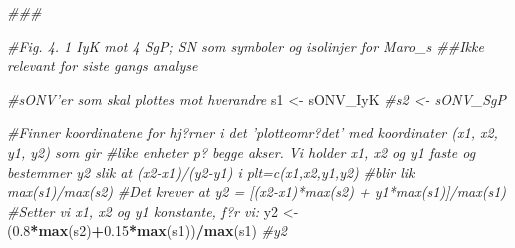 \documentclass[]{article}
\newenvironment{Shaded}{\begin{snugshade}}{\end{snugshade}}
\newcommand{\CommentTok}[1]{\textcolor[rgb]{0.56,0.35,0.01}{\textit{#1}}}
\newcommand{\FloatTok}[1]{\textcolor[rgb]{0.00,0.00,0.81}{#1}}
\newcommand{\KeywordTok}[1]{\textcolor[rgb]{0.13,0.29,0.53}{\textbf{#1}}}
\newcommand{\NormalTok}[1]{#1}
\newcommand{\OperatorTok}[1]{\textcolor[rgb]{0.81,0.36,0.00}{\textbf{#1}}}
\newcommand{\StringTok}[1]{\textcolor[rgb]{0.31,0.60,0.02}{#1}}
\begin{document}
\begin{Shaded}
\begin{Highlighting}[]
\CommentTok{###}

\CommentTok{#Fig. 4. 1 IyK mot 4 SgP; SN som symboler og isolinjer for Maro_s ##Ikke relevant for siste gangs analyse}

\CommentTok{#sONV'er som skal plottes mot hverandre}
\NormalTok{s1 <-}\StringTok{ }\NormalTok{sONV_IyK}
\CommentTok{#s2 <- sONV_SgP}

\CommentTok{#Finner koordinatene for hj?rner i det 'plotteomr?det' med koordinater (x1, x2, y1, y2) som gir}
\CommentTok{#like enheter p? begge akser. Vi holder x1, x2 og y1 faste og bestemmer y2 slik at (x2-x1)/(y2-y1) i plt=c(x1,x2,y1,y2)}
\CommentTok{#blir lik max(s1)/max(s2)}
\CommentTok{#Det krever at y2 = [(x2-x1)*max(s2) + y1*max(s1)]/max(s1) }
\CommentTok{#Setter vi x1, x2 og y1 konstante, f?r vi:}
\NormalTok{y2 <-}\StringTok{ }\NormalTok{(}\FloatTok{0.8}\OperatorTok{*}\KeywordTok{max}\NormalTok{(s2)}\OperatorTok{+}\FloatTok{0.15}\OperatorTok{*}\KeywordTok{max}\NormalTok{(s1))}\OperatorTok{/}\KeywordTok{max}\NormalTok{(s1)}
\CommentTok{#y2}


\end{Highlighting}
\end{Shaded}
\end{document}
